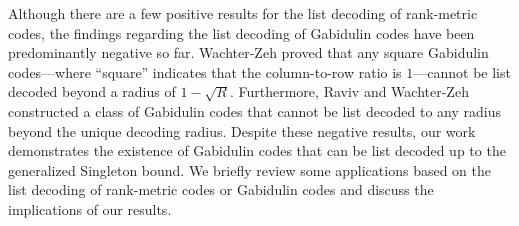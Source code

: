 \documentclass[11pt]{article}
\newif\ifmynotes
\newcommand{\CYnote}[1]{\ifmynotes\textcolor{orange}{[Chen: #1]}\else\fi}
\theoremstyle{plain}
\theoremstyle{definition}
\theoremstyle{remark}
\begin{document}
Although there are a few positive results for the list decoding of rank-metric codes, the findings regarding the list decoding of Gabidulin codes have been predominantly negative so far. Wachter-Zeh \cite{WZ13} proved that any square Gabidulin codes---where ``square'' indicates that the column-to-row ratio is $1$---cannot be list decoded beyond a radius of $1-\sqrt{R}$. Furthermore, Raviv and Wachter-Zeh \cite{raviv2016some,raviv2017correction} constructed a class of Gabidulin codes that cannot be list decoded to any radius beyond the unique decoding radius. Despite these negative results, our work demonstrates the existence of Gabidulin codes that can be list decoded up to the generalized Singleton bound. We briefly review some applications based on the list decoding of rank-metric codes or Gabidulin codes and discuss the implications of our results. %
\end{document}
